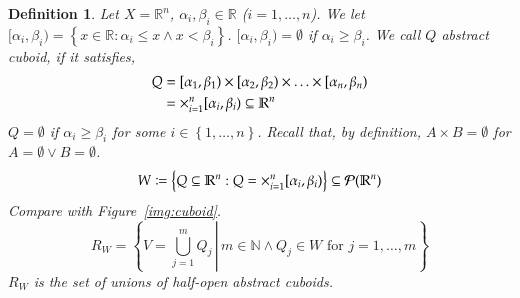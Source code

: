\documentclass{article}
\newtheorem{definition}{Definition}  \numberwithin{definition}{section}
\newcommand{\set}[1]{\left\{#1\right\}}
\newcommand{\setdef}[2]{\left\{\left.#1\,\right|\,#2\right\}}
\begin{document}
\begin{definition}
  Let $X = \mathbb R^n$, $\alpha_i, \beta_i \in \mathbb R$ ($i=1,\ldots,n$).
  We let $[\alpha_i, \beta_i) = \set{x \in \mathbb R: \alpha_i \leq x \land x < \beta_i}$.
  $[\alpha_i, \beta_i) = \emptyset$ if $\alpha_i \geq \beta_i$.
  We call $Q$ \emph{abstract cuboid}, if it satisfies,
  \begin{align*}
    Q &= [\alpha_1, \beta_1) \times [\alpha_2, \beta_2) \times \ldots \times [\alpha_n, \beta_n) \\
      &= \huge\times_{i=1}^n [\alpha_i, \beta_i) \subseteq \mathbb R^n
  \end{align*}
  $Q = \emptyset$ if $\alpha_i \geq \beta_i$ for some $i \in \set{1,\ldots,n}$.
  Recall that, by definition, $A \times B = \emptyset$ for $A = \emptyset \lor B = \emptyset$.
  \[ W \coloneqq \set{Q \subseteq \mathbb R^n: Q = {\huge\times}_{i=1}^n [\alpha_i, \beta_i)} \subseteq \mathcal P(\mathbb R^n) \]
  Compare with Figure~\ref{img:cuboid}.
  \[ R_W = \setdef{V = \bigcup_{j=1}^m Q_j}{m \in \mathbb N \land Q_j \in W \text{ for } j = 1,\ldots,m} \]
  $R_W$ is the set of unions of half-open abstract cuboids.
\end{definition}
\end{document}
